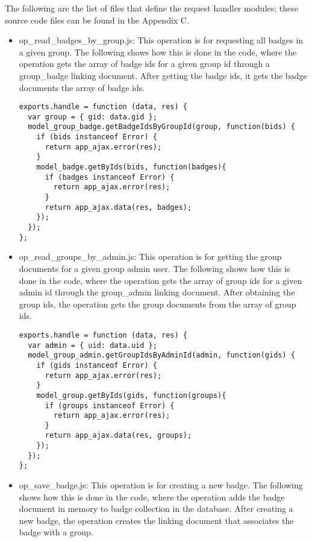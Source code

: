 The following are the list of files that define the request handler modules; these source code files can be found in the Appendix C.

\begin{itemize}
\item op{\_}read{\_}badges{\_}by{\_}group.js: This operation is for requesting all badges in a given group. The following shows how this is done in the code, where the operation gets the array of badge ids for a given group id through a group{\_}badge linking document. After getting the badge ids, it gets the badge documents the array of badge ids. 

\begin{lstlisting}
exports.handle = function (data, res) {
  var group = { gid: data.gid };
  model_group_badge.getBadgeIdsByGroupId(group, function(bids) {
    if (bids instanceof Error) {
      return app_ajax.error(res);
    }
    model_badge.getByIds(bids, function(badges){
      if (badges instanceof Error) {
        return app_ajax.error(res);
      }
      return app_ajax.data(res, badges);
    });
  });
};
\end{lstlisting}

\item op{\_}read{\_}groups{\_}by{\_}admin.js: This operation is for getting the group documents for a given group admin user.  The following shows how this is done in the code, where the operation gets the array of group ids for a given admin id through the group{\_}admin linking document.  After obtaining the group ids, the operation gets the group documents from the array of group ids.

\begin{lstlisting}
exports.handle = function (data, res) {
  var admin = { uid: data.uid };
  model_group_admin.getGroupIdsByAdminId(admin, function(gids) {
    if (gids instanceof Error) {
      return app_ajax.error(res);
    }
    model_group.getByIds(gids, function(groups){
      if (groups instanceof Error) {
        return app_ajax.error(res);
      }
      return app_ajax.data(res, groups);
    });
  });
};
\end{lstlisting}

\item op{\_}save{\_}badge.js: This operation is for creating a new badge. The following shows how this is done in the code, where the operation adds the badge document in memory to badge collection in the database.  After creating a new badge, the operation creates the linking document that associates the badge with a group. 


\end{itemize}

